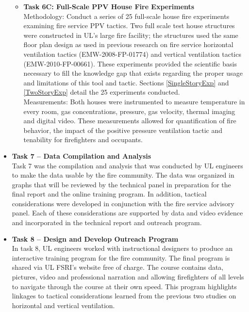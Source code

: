 \documentclass{article}
\begin{document}
\begin{itemize}
\begin{itemize}
		\item \textbf{Task 6C: Full-Scale PPV House Fire Experiments} \\
		Methodology: Conduct a series of 25 full-scale house fire experiments examining fire service PPV tactics. Two full scale test house structures were constructed in UL’s large fire facility; the structures used the same floor plan design as used in previous research on fire service horizontal ventilation tactics (EMW-2008-FP-01774)\cite{DHS2008} and vertical ventilation tactics (EMW-2010-FP-00661)\cite{DHS2010}. These experiments provided the scientific basis necessary to fill the knowledge gap that exists regarding the proper usage and limitations of this tool and tactic. Sections \ref{SingleStoryExp} and \ref{TwoStoryExp} detail the 25 experiments conducted.
		\\
		Measurements: Both houses were instrumented to measure temperature in every room, gas concentrations, pressure, gas velocity, thermal imaging and digital video. These measurements allowed for quantification of fire behavior, the impact of the positive pressure ventilation tactic and tenability for firefighters and occupants.
	\end{itemize}
	\item \textbf{Task 7 – Data Compilation and Analysis} \\
	Task 7 was the compilation and analysis that was conducted by UL engineers to make the data usable by the fire community. The data was organized in graphs that will be reviewed by the technical panel in preparation for the final report and the online training program. In addition, tactical considerations were developed in conjunction with the fire service advisory panel. Each of these considerations are supported by data and video evidence and incorporated in the technical report and outreach program.
	
	\item \textbf{Task 8 – Design and Develop Outreach Program} \\
	In task 8, UL engineers worked with instructional designers to produce an interactive training program for the fire community. The final program is shared via UL FSRI's website free of charge.  The course contains data, pictures, video and professional narration and allowing firefighters of all levels to navigate through the course at their own speed. This program highlights linkages to tactical considerations learned from the previous two studies on horizontal and vertical ventilation.
	

\end{itemize}
\end{document}
